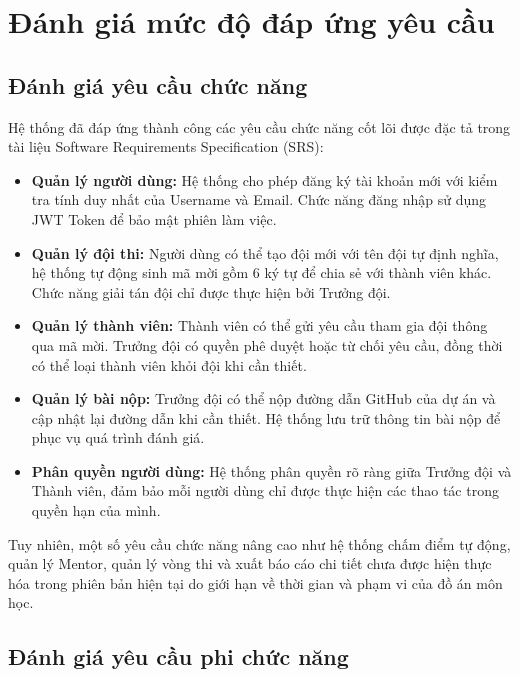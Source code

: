 \section{Đánh giá mức độ đáp ứng yêu cầu}

\subsection{Đánh giá yêu cầu chức năng}

Hệ thống đã đáp ứng thành công các yêu cầu chức năng cốt lõi được đặc tả trong tài liệu Software Requirements Specification (SRS):

\begin{itemize}
	\item \textbf{Quản lý người dùng:} Hệ thống cho phép đăng ký tài khoản mới với kiểm tra tính duy nhất của Username và Email. Chức năng đăng nhập sử dụng JWT Token để bảo mật phiên làm việc.
	
	\item \textbf{Quản lý đội thi:} Người dùng có thể tạo đội mới với tên đội tự định nghĩa, hệ thống tự động sinh mã mời gồm 6 ký tự để chia sẻ với thành viên khác. Chức năng giải tán đội chỉ được thực hiện bởi Trưởng đội.
	
	\item \textbf{Quản lý thành viên:} Thành viên có thể gửi yêu cầu tham gia đội thông qua mã mời. Trưởng đội có quyền phê duyệt hoặc từ chối yêu cầu, đồng thời có thể loại thành viên khỏi đội khi cần thiết.
	
	\item \textbf{Quản lý bài nộp:} Trưởng đội có thể nộp đường dẫn GitHub của dự án và cập nhật lại đường dẫn khi cần thiết. Hệ thống lưu trữ thông tin bài nộp để phục vụ quá trình đánh giá.
	
	\item \textbf{Phân quyền người dùng:} Hệ thống phân quyền rõ ràng giữa Trưởng đội và Thành viên, đảm bảo mỗi người dùng chỉ được thực hiện các thao tác trong quyền hạn của mình.
\end{itemize}

Tuy nhiên, một số yêu cầu chức năng nâng cao như hệ thống chấm điểm tự động, quản lý Mentor, quản lý vòng thi và xuất báo cáo chi tiết chưa được hiện thực hóa trong phiên bản hiện tại do giới hạn về thời gian và phạm vi của đồ án môn học.


\subsection{Đánh giá yêu cầu phi chức năng}

